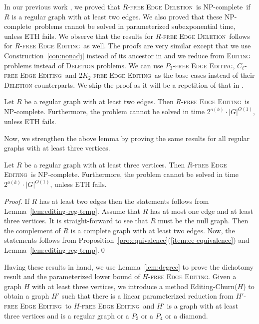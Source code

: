 \documentclass[envcountsame,envcountsect,10pt,oribibl]{llncs}
\newcommand{\pname}[1]{\textnormal{\textsc{#1}}}
\newcommand{\cclass}[1]{\textnormal{\textsf{#1}}}
\newcommand{\HEE}{\pname{$H$-free Edge Editing}}
\newcommand{\HDEE}{\pname{$H'$-free Edge Editing}}
\newcommand{\RED}{\pname{$R$-free Edge Deletion}}
\newcommand{\REE}{\pname{$R$-free Edge Editing}}
\newcommand{\PTEE}{\pname{$P_3$-free Edge Editing}}
\newcommand{\CLEE}{\pname{$C_\ell$-free Edge Editing}}
\newcommand{\TWKTEE}{\pname{$2K_2$-free Edge Editing}}
\newcommand{\NPC}{\cclass{NP-complete}}
\begin{document}
In our previous work \cite{DBLP:conf/cocoa/AravindSS15},
we proved that \RED\ is \NPC\ if $R$ is a regular graph
with at least two edges. We also proved that these
\NPC\ problems cannot be solved in parameterized 
subexponential time, unless ETH fails.
We observe that the results for \RED\ follows for
\REE\ as well. The proofs are very similar except
that we use Construction~\ref{con:nonadj} instead of its
ancestor in \cite{DBLP:conf/cocoa/AravindSS15} and we
reduce from \textsc{Editing} problems instead of \textsc{Deletion}
problems. We can use \PTEE, \CLEE\ and \TWKTEE\ as the base cases instead of their
\textsc{Deletion} counterparts.
We skip the proof as it will 
be a repetition of that in \cite{DBLP:conf/cocoa/AravindSS15}.

\begin{lemma}
  \label{lem:editing-reg-temp}
  Let $R$ be a regular graph with at least two edges.
  Then \REE\ is \NPC. Furthermore, the problem cannot be
  solved in time $2^{o(k)}\cdot |G|^{O(1)}$, unless ETH fails.
\end{lemma}

Now, we strengthen the above lemma by proving the same results for all 
regular graphs with at least three vertices.

\begin{lemma}
  \label{lem:editing-reg}
  Let $R$ be a regular graph with at least three vertices.
  Then \REE\ is \NPC. Furthermore, the problem cannot be
  solved in time $2^{o(k)}\cdot |G|^{O(1)}$, unless ETH fails.
\end{lemma}
\begin{proof}
  If $R$ has at least two edges then the statements follows from 
  Lemma~\ref{lem:editing-reg-temp}. Assume that
  $R$ has at most one edge and at least three vertices. It is 
  straight-forward to see that $R$ must be the null graph.
  Then the complement of $R$ is a complete graph with at least two edges. 
  Now, the statements follows from Proposition~\ref{pro:equivalence}(\ref{item:ee-equivalence})
  and Lemma~\ref{lem:editing-reg-temp}.\qed
\end{proof}

Having these results in hand, we use Lemma~\ref{lem:degree} to prove the 
dichotomy result and the parameterized lower bound of \HEE.
Given a graph $H$ with at least three vertices, we introduce a method 
Editing-Churn($H$) to 
obtain a graph $H'$ such that there is a linear parameterized reduction
from \HDEE\ to \HEE\ and $H'$ is a graph with at least three vertices
and is a regular graph or a $P_3$ or a $P_4$ or a diamond.
\end{document}
